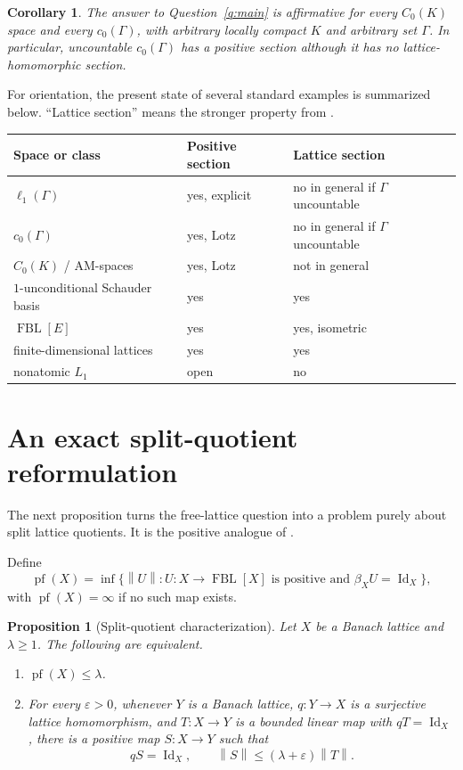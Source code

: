 \documentclass[11pt]{article}
\newtheorem{proposition}[theorem]{Proposition}
\newtheorem{corollary}[theorem]{Corollary}
\newcommand{\FBL}{\operatorname{FBL}}
\newcommand{\Id}{\operatorname{Id}}
\newcommand{\pf}{\operatorname{pf}}
\newcommand{\norm}[1]{\left\lVert #1\right\rVert}
\begin{document}
\begin{corollary}\label{cor:am}
The answer to Question~\ref{q:main} is affirmative for every $C_0(K)$ space and every
$c_0(\Gamma)$, with arbitrary locally compact $K$ and arbitrary set $\Gamma$.
In particular, uncountable $c_0(\Gamma)$ has a positive section although it
has no lattice-homomorphic section.
\end{corollary}

For orientation, the present state of several standard examples is summarized
below.  ``Lattice section'' means the stronger property from
\cite{AvilesEtAl2022}.

\begin{center}
\begin{tabular}{@{}lll@{}}
\toprule
Space or class & Positive section & Lattice section \\
\midrule
$\ell_1(\Gamma)$ & yes, explicit & no in general if $\Gamma$ uncountable \\
$c_0(\Gamma)$ & yes, Lotz & no in general if $\Gamma$ uncountable \\
$C_0(K)$ / AM-spaces & yes, Lotz & not in general \\
$1$-unconditional Schauder basis & yes & yes \\
$\FBL[E]$ & yes & yes, isometric \\
finite-dimensional lattices & yes & yes \\
nonatomic $L_1$ & open & no \\
\bottomrule
\end{tabular}
\end{center}

\section{An exact split-quotient reformulation}

The next proposition turns the free-lattice question into a problem purely
about split lattice quotients.  It is the positive analogue of
\cite[Proposition~2.1]{AvilesEtAl2022}.

Define
\[
 \pf(X)=\inf\bigl\{\norm U:
 U:X\to\FBL[X]\text{ is positive and }\beta_XU=\Id_X\bigr\},
\]
with $\pf(X)=\infty$ if no such map exists.

\begin{proposition}[Split-quotient characterization]\label{prop:split}
Let $X$ be a Banach lattice and $\lambda\geq1$.  The following are equivalent.
\begin{enumerate}[label=(\alph*),leftmargin=2.2em]
\item $\pf(X)\leq\lambda$.
\item For every $\varepsilon>0$, whenever $Y$ is a Banach lattice,
$q:Y\to X$ is a surjective lattice homomorphism, and $T:X\to Y$ is a
bounded linear map with $qT=\Id_X$, there is a positive map $S:X\to Y$
such that
\[
 qS=\Id_X,
 \qquad \norm S\leq(\lambda+\varepsilon)\norm T.
\]
\end{enumerate}
\end{proposition}
\end{document}
